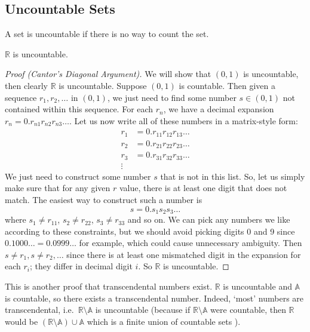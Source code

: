 \subsection{Uncountable Sets}
\begin{definition}
	A set is uncountable if there is no way to count the set.
\end{definition}
\begin{theorem}
	\(\mathbb R\) is uncountable.
\end{theorem}
\begin{proof}[Proof (Cantor's Diagonal Argument)]
	We will show that \((0, 1)\) is uncountable, then clearly \(\mathbb R\) is uncountable.
	Suppose \((0, 1)\) is countable.
	Then given a sequence \(r_1, r_2, \dots\) in \((0, 1)\), we just need to find some number \(s \in (0, 1)\) not contained within this sequence.
	For each \(r_n\), we have a decimal expansion \(r_n = 0.r_{n1}r_{n2}r_{n3}\dots\).
	Let us now write all of these numbers in a matrix-style form:
	\begin{align*}
		r_1 & = 0.r_{11}r_{12}r_{13}\dots \\
		r_2 & = 0.r_{21}r_{22}r_{23}\dots \\
		r_3 & = 0.r_{31}r_{32}r_{33}\dots \\
		\vdots
	\end{align*}
	We just need to construct some number \(s\) that is not in this list.
	So, let us simply make sure that for any given \(r\) value, there is at least one digit that does not match.
	The easiest way to construct such a number is
	\[
		s = 0.s_1 s_2 s_3 \dots
	\]
	where \(s_1 \neq r_{11}\), \(s_2 \neq r_{22}\), \(s_3 \neq r_{33}\) and so on.
	We can pick any numbers we like according to these constraints, but we should avoid picking digits 0 and 9 since \(0.1000\dots = 0.0999\dots\) for example, which could cause unnecessary ambiguity.
	Then \(s \neq r_1, s \neq r_2, \dots\) since there is at least one mismatched digit in the expansion for each \(r_i\); they differ in decimal digit \(i\).
	So \(\mathbb R\) is uncountable.
\end{proof}
This is another proof that transcendental numbers exist.
\(\mathbb R\) is uncountable and \(\mathbb A\) is countable, so there exists a transcendental number.
Indeed, `most' numbers are transcendental, i.e.\ \(\mathbb R \setminus \mathbb A\) is uncountable (because if \(\mathbb R \setminus \mathbb A\) were countable, then \(\mathbb R\) would be \((\mathbb R \setminus \mathbb A) \cup \mathbb A\) which is a finite union of countable sets \contradiction).
